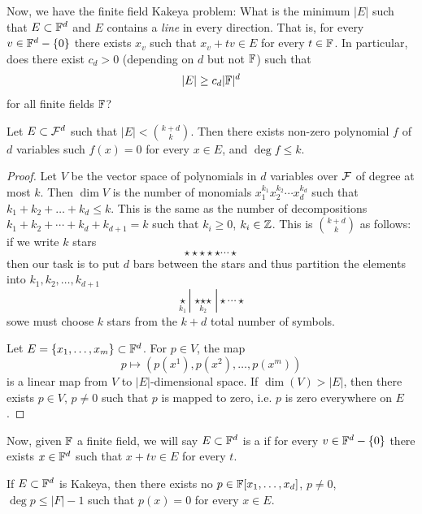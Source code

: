 Now, we have the finite field Kakeya problem: What is the minimum $|E|$ such that $E\subset \mathbb{F}^d$ and $E$ contains a \emph{line} in every direction. That is, for every $v\in \mathbb{F}^d-\{0\}$ there exists $x_v$ such that $x_v + tv\in E$ for every $t\in \mathbb{F}$.
In particular, does there exist $c_d>0$ (depending on $d$ but not $\mathbb{F}$) such that
\[
|E| \geq c_d |\mathbb{F}|^d
\]
for all finite fields $\mathbb{F}$?
\begin{lemma}\label{lem10p8:polynomial_vanishes_on_E}
Let $E\subset \mathcal{F}^d$ such that $|E|< {k+d \choose k}$. Then there exists non-zero polynomial $f$ of $d$ variables such  $f(x)=0$ for every $x\in E$, and $\deg f \leq k$. 
\end{lemma}
\begin{proof}	
Let $V$ be the vector space of polynomials in $d$ variables over $\mathcal{F}$ of degree at most $k$. Then $\dim V$ is the number of monomials $x_1^{k_1}x_2^{k_2}\dotsm x_d^{k_d}$ such that $k_1+k_2+\dotsc+k_d \leq k$. This is the same as the number of decompositions $k_1 + k_2 + \dotsm + k_d + k_{d+1} = k$ such that $k_i\geq 0$, $k_i \in \mathbb{Z}$. This is ${k+d \choose k}$ as follows:
 if we write $k$ stars
\[
\star \star \star \star \star \dotsm \star\]
then our task is to put $d$ bars between the stars and thus partition the elements into $k_1,k_2,\dotsc,k_{d+1}$
\[
 \operatorname*{\star}_{k_1}|\operatorname*{\star \star \star}_{k_2} | \star \dotsm \star
\]
sowe must choose $k$ stars from the $k+d$ total number of symbols.

Let $E = \{x_1,\dotsc,x_m\}\subset\mathbb{F}^d$. For $p\in V$, the map
\[
p\mapsto ( p(x^1),p(x^2),\dotsc,p(x^m))
\]
is a linear map from $V$ to $|E|$-dimensional space.
If $\dim(V) > |E|$, then there exists $p\in V$, $p\neq 0$ such that $p$ is mapped to zero, i.e. $p$ is zero everywhere on $E$.
\end{proof}
Now, given $\mathbb{F}$ a finite field, we will say $E\subset \mathbb{F}^d$ is a  if for every $v\in \mathbb{F}^d - \{0\}$ there exists $x\in \mathbb{F}^d$ such that $x+tv \in E$ for every $t$.
\begin{lemma}
If $E\subset \mathbb{F}^d$ is Kakeya, then there exists no $p\in \mathbb{F}[x_1,\dotsc,x_d]$, $p\neq 0$, $\deg p\leq |F| - 1$ such that $p(x) = 0$ for every $x\in E$.
\end{lemma}
